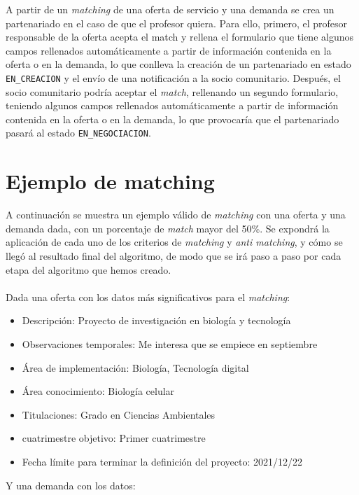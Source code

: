 \documentclass[11pt]{book}
\begin{document}
	A partir de un \emph{matching} de una oferta de servicio y una demanda se crea un partenariado en el caso de que el profesor quiera. Para ello, primero, el profesor responsable de la oferta acepta el match y rellena el formulario que tiene  algunos campos rellenados automáticamente a partir de información contenida en la oferta o en la demanda, lo que conlleva la creación de un partenariado en estado \texttt{EN\_CREACION} y el envío de una notificación a la socio comunitario. Después, el socio comunitario podría aceptar el \emph{match}, rellenando un segundo formulario, teniendo algunos campos rellenados automáticamente a partir de información contenida en la oferta o en la demanda, lo que provocaría que el partenariado pasará al estado \texttt{EN\_NEGOCIACION}.
	\section{Ejemplo de matching}
	A continuación se muestra un ejemplo válido de \emph{matching} con una oferta y una demanda dada, con un porcentaje de \emph{match} mayor del 50\%. Se expondrá la aplicación de cada uno de los criterios de \emph{matching} y \emph{anti matching}, y cómo se llegó al resultado final del algoritmo, de modo que se irá paso a paso por cada etapa del algoritmo que hemos creado.\\\\
	Dada una oferta con los datos más significativos para el \emph{matching}:\\
	\begin{itemize} 
		\item Descripción: Proyecto de investigación en biología y tecnología
		\item Observaciones temporales: Me interesa que se empiece en septiembre
		\item Área de implementación: Biología, Tecnología digital
		\item Área conocimiento: Biología celular
		\item Titulaciones: Grado en Ciencias Ambientales
		\item cuatrimestre objetivo: Primer cuatrimestre
		\item Fecha límite para terminar la definición del proyecto: 2021/12/22
		\\
	\end{itemize}
	Y una demanda con los datos:\\
\end{document}
